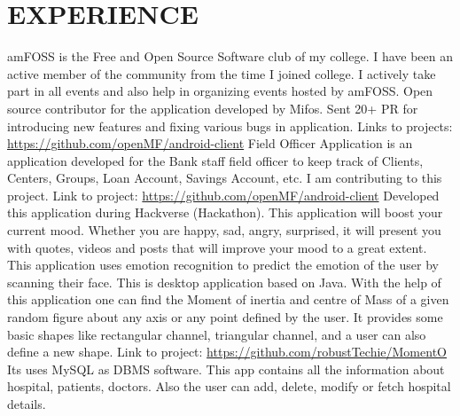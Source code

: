 \documentclass[11pt,a4paper,sans]{moderncv}        %
\begin{document}
\section{EXPERIENCE}
{amFOSS is the Free and Open Source Software club of my college. I have been an active member of the community from the time I joined college. I actively take part in all events and also help in organizing events hosted by amFOSS.}
{ Open source contributor for the application developed by Mifos. Sent 20+ PR for introducing new features and fixing various bugs in application. Links to projects:{\newline} 
\url{https://github.com/openMF/android-client}}{}  %
{Field Officer Application is an application developed for the Bank staff field officer to keep track of Clients, Centers, Groups, Loan Account, Savings Account, etc. I am contributing to this project. Link to project:{\newline} 
\url{https://github.com/openMF/android-client}}{}  %
{Developed this application during Hackverse (Hackathon). This application will boost your current mood. Whether you are happy, sad, angry, surprised, it will present you with quotes, videos and posts that will improve your mood to a great extent. This application uses emotion recognition to predict the emotion of the user by scanning their face.}
{This is desktop application based on Java. With the help of this application one can find the Moment of inertia and centre of Mass of a given random figure about any axis or any point defined by the user. It provides some basic shapes like rectangular channel, triangular channel, and a user can also define a new shape.  Link to project:{\newline}
\url{https://github.com/robustTechie/MomentO}}{}
{Its uses MySQL as DBMS software. This app contains all the information about hospital, patients, doctors. Also the user can add, delete, modify or fetch hospital details.  {\newline}}{}   %
\end{document}

